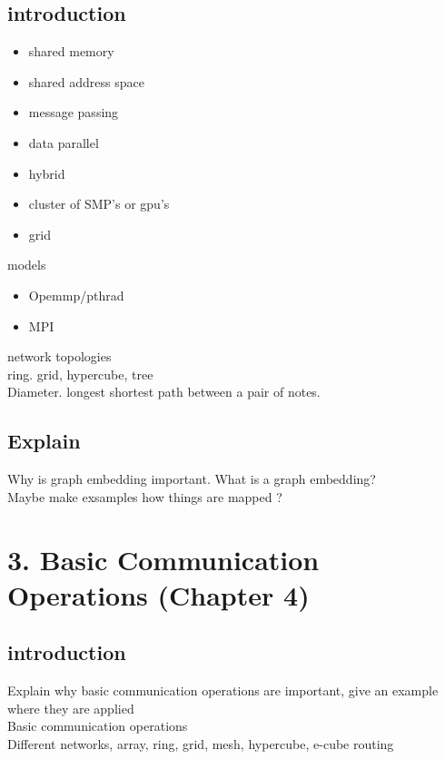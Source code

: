 \documentclass[a4paper,10pt,titlepage]{report}
\begin{document}
\subsection{introduction}
\begin{itemize}
\item shared memory
\item shared address space
\item message passing
\item data parallel
\item hybrid
\item cluster of SMP's or gpu's
\item grid
\end{itemize}
models
\begin{itemize}
\item Opemmp/pthrad
\item MPI
\end{itemize}
network topologies\\
ring. grid, hypercube, tree\\
Diameter. longest shortest path between a pair of notes. \\


\subsection{Explain} 
Why is graph embedding important. What is a graph embedding? \\
Maybe make exsamples how things are mapped ? \\




\newpage
\section{3. Basic Communication Operations (Chapter 4) }
\subsection{introduction}
Explain why basic communication operations are important, give an example where they are applied\\
\hspace{5mm}      Basic communication operations \\
\hspace{5mm}      Different networks, array, ring, grid, mesh, hypercube, e-cube routing \\
      
\end{document}
